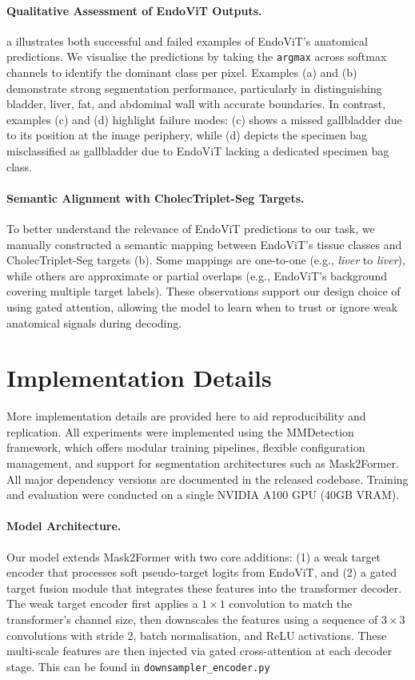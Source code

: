 \paragraph{Qualitative Assessment of EndoViT Outputs.}
a illustrates both successful and failed examples of EndoViT’s anatomical predictions. We visualise the predictions by taking the \texttt{argmax} across softmax channels to identify the dominant class per pixel. Examples (a) and (b) demonstrate strong segmentation performance, particularly in distinguishing bladder, liver, fat, and abdominal wall with accurate boundaries. In contrast, examples (c) and (d) highlight failure modes: (c) shows a missed gallbladder due to its position at the image periphery, while (d) depicts the specimen bag misclassified as gallbladder due to EndoViT lacking a dedicated specimen bag class.

\paragraph{Semantic Alignment with CholecTriplet-Seg Targets.}
To better understand the relevance of EndoViT predictions to our task, we manually constructed a semantic mapping between EndoViT’s tissue classes and CholecTriplet-Seg targets (b). Some mappings are one-to-one (e.g., \textit{liver} to \textit{liver}), while others are approximate or partial overlaps (e.g., EndoViT’s background covering multiple target labels). These observations support our design choice of using gated attention, allowing the model to learn when to trust or ignore weak anatomical signals during decoding.


\section{Implementation Details}
More implementation details are provided here to aid reproducibility and replication. All experiments were implemented using the MMDetection framework, which offers modular training pipelines, flexible configuration management, and support for segmentation architectures such as Mask2Former. All major dependency versions are documented in the released codebase. Training and evaluation were conducted on a single NVIDIA A100 GPU (40GB VRAM).

\paragraph{Model Architecture.}
Our model extends Mask2Former with two core additions: (1) a weak target encoder that processes soft pseudo-target logits from EndoViT, and (2) a gated target fusion module that integrates these features into the transformer decoder. The weak target encoder first applies a $1 \times 1$ convolution to match the transformer’s channel size, then downscales the features using a sequence of $3 \times 3$ convolutions with stride 2,  batch normalisation, and ReLU activations. These multi-scale features are then injected via gated cross-attention at each decoder stage. This can be found in \texttt{downsampler\_encoder.py}

